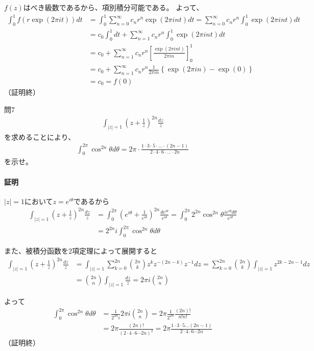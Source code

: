 $f(z)$はべき級数であるから、項別積分可能である。
よって、
\begin{align*}
   \int_{0}^{1}f(r\exp(2\pi it))dt
   &=\int_{0}^{1}\sum_{n=0}^{\infty}c_nr^n\exp(2\pi int)dt
   =\sum_{n=0}^{\infty}c_nr^n\int_{0}^{1}\exp(2\pi int)dt\\
   &=c_0\int_{0}^{1}dt+\sum_{n=1}^{\infty}c_nr^n\int_{0}^{1}\exp(2\pi int)dt\\
   &=c_0+\sum_{n=1}^{\infty}c_nr^n\left[\frac{\exp(2\pi int)}{2\pi in}\right]_0^1\\
   &=c_0+\sum_{n=1}^{\infty}c_nr^n\frac{1}{2\pi in}\left\{\exp(2\pi in)-\exp(0)\right\}\\
   &=c_0=f(0)
\end{align*}
（証明終）

\begin{mysimplebox}{問7}
   \begin{align*}
      \int_{|z|=1}\left(z+\frac{1}{z}\right)^{2n}\frac{dz}{z}
   \end{align*}
   を求めることにより、
   \begin{align*}
      \int_{0}^{2\pi}\cos^{2n}\theta d\theta
      =2\pi\cdot\frac{1\cdot3\cdot5\cdot\dots\cdot(2n-1)}{2\cdot4\cdot6\cdot\dots\cdot2n}
   \end{align*}
   を示せ。
\end{mysimplebox}
\paragraph{証明}
$|z|=1$において$z=e^{i\theta}$であるから
\begin{align*}
   \int_{|z|=1}\left(z+\frac{1}{z}\right)^{2n}\frac{dz}{z}
   &=\int_{0}^{2\pi}\left(e^{i\theta}+\frac{1}{e^{i\theta}}\right)^{2n}\frac{de^{i\theta}}{e^{i\theta}}
   =\int_{0}^{2\pi}2^{2n}\cos^{2n}\theta\frac{ie^{i\theta}d\theta}{e^{i\theta}}\\
   &=2^{2n}i\int_{0}^{2\pi}\cos^{2n}\theta d\theta
\end{align*}

また、被積分函数を2項定理によって展開すると
\begin{align*}
   \int_{|z|=1}\left(z+\frac{1}{z}\right)^{2n}\frac{dz}{z}
   &=\int_{|z|=1}\sum_{k=0}^{2n}\binom{2n}{k}z^kz^{-(2n-k)}z^{-1}dz
   =\sum_{k=0}^{2n}\binom{2n}{k}\int_{|z|=1}z^{2k-2n-1}dz\\
   &=\binom{2n}{n}\int_{|z|=1}\frac{dz}{z}=2\pi i\binom{2n}{n}
\end{align*}

よって
\begin{align*}
   \int_{0}^{2\pi}\cos^{2n}\theta d\theta
   &=\frac{1}{2^{2n}i}2\pi i\binom{2n}{n}
   =2\pi\frac{1}{2^{2n}}\frac{(2n)!}{n!n!}\\
   &=2\pi\frac{(2n)!}{(2\cdot4\cdot6\cdots2n)^2}
   =2\pi\frac{1\cdot3\cdot5\dots(2n-1)}{2\cdot4\cdot6\cdots2n}
\end{align*}
（証明終）
